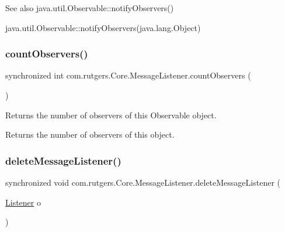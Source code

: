 \begin{DoxySeeAlso}{See also}
java.\+util.\+Observable\+::notify\+Observers() 

java.\+util.\+Observable\+::notify\+Observers(java.\+lang.\+Object) 
\end{DoxySeeAlso}
\mbox{\label{classcom_1_1rutgers_1_1Core_1_1MessageListener_a724d20378cbeac3df288bf36622a8bc5}} 
\subsubsection{\texorpdfstring{count\+Observers()}{countObservers()}}
{\footnotesize\ttfamily synchronized int com.\+rutgers.\+Core.\+Message\+Listener.\+count\+Observers (\begin{DoxyParamCaption}{ }\end{DoxyParamCaption})}

Returns the number of observers of this {\ttfamily Observable} object.

\begin{DoxyReturn}{Returns}
the number of observers of this object. 
\end{DoxyReturn}
\mbox{\label{classcom_1_1rutgers_1_1Core_1_1MessageListener_a58dde408a2879983fe3f1a16b7430a2e}} 
\subsubsection{\texorpdfstring{delete\+Message\+Listener()}{deleteMessageListener()}}
{\footnotesize\ttfamily synchronized void com.\+rutgers.\+Core.\+Message\+Listener.\+delete\+Message\+Listener (\begin{DoxyParamCaption}\item[{\hyperlink{interfacecom_1_1rutgers_1_1Core_1_1Listener}{Listener}}]{o }\end{DoxyParamCaption})}

